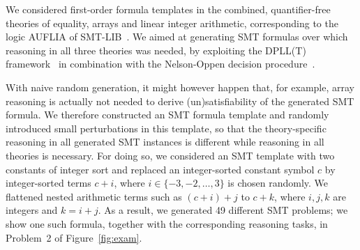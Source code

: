 We considered first-order formula templates in the combined,
quantifier-free 
theories of equality, arrays and linear integer arithmetic,
corresponding to the logic AUFLIA of
SMT-LIB~\cite{barrett2017smtlib}. We aimed at generating SMT formulas
over which reasoning in all three theories was needed, by exploiting
the DPLL(T) framework~\cite{Tinelli02} in combination with the
Nelson-Oppen decision procedure~\cite{Nelson79}.
%

With naive random generation, it might however happen
that, for example, array reasoning is actually not needed to derive
(un)satisfi\-ability of the generated SMT formula. We therefore constructed an
SMT formula template and randomly introduced small perturbations in this template,
so that the theory-specific reasoning in all generated SMT instances is
different while reasoning in all theories is necessary.
%
For doing so, we considered an SMT template with two constants of
integer sort and replaced an integer-sorted constant symbol $c$ by  integer-sorted terms $c+i$,
where $i \in \{-3,-2,\dots,3\}$ is chosen randomly. We flattened nested arithmetic terms such as $(c+i)+j$ to $c+k$,
where $i,j,k$ are integers and $k = i+j$. As a result, we
generated 49 different SMT problems; we show one such formula, together
with the corresponding reasoning tasks, in Problem~2 of Figure~\ref{fig:exam}.
